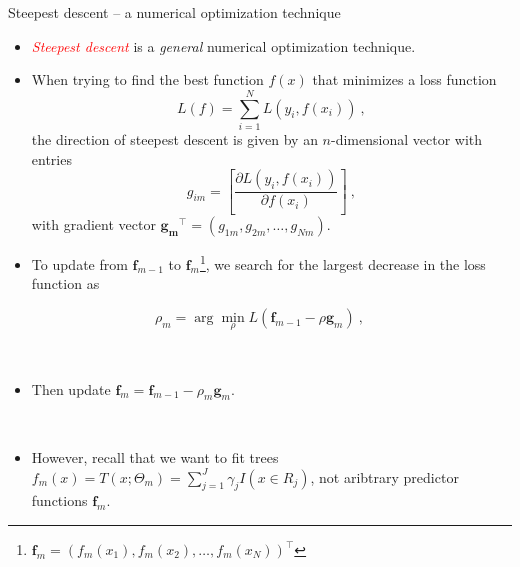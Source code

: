 \documentclass[
  10pt,
  ignorenonframetext,
]{beamer}
\providecommand{\tightlist}{%
  \setlength{\itemsep}{0pt}\setlength{\parskip}{0pt}}
\begin{document}
\begin{frame}
\begin{block}{Steepest descent -- a numerical optimization technique}
\protect\hypertarget{steepest-descent-a-numerical-optimization-technique}{}
\(~\)

\begin{itemize}
\tightlist
\item
  \emph{\textcolor{red}{Steepest descent}} is a \emph{general} numerical
  optimization technique.
\end{itemize}

\vspace{2mm}

\begin{itemize}
\tightlist
\item
  When trying to find the best function \(f(x)\) that minimizes a loss
  function \[L(f) = \sum_{i=1}^N L(y_i,f(x_i)) \ ,\] the direction of
  steepest descent is given by an \(n\)-dimensional vector with entries
  \[g_{im} = \left[ \frac{\partial L(y_i,f(x_i))}{\partial f(x_i)} \right] \ ,\]
  with gradient vector
  \(\mathbf{g_m}^\top = (g_{1m},g_{2m},\ldots, g_{Nm})\).
\end{itemize}
\end{block}
\end{frame}

\begin{frame}
\begin{itemize}
\tightlist
\item
  To update from \(\mathbf{f}_{m-1}\) to
  \(\mathbf{f}_m\)\footnote{$\mathbf{f}_m = (f_m(x_1),f_m(x_2),\ldots, f_m(x_N))^\top$ },
  we search for the largest decrease in the loss function as
\end{itemize}

\[\rho_m = \arg \min_\rho L(\mathbf{f}_{m-1} - \rho \mathbf{g}_m) \ , \]

\(~\)

\begin{itemize}
\tightlist
\item
  Then update \(\mathbf{f}_m = \mathbf{f}_{m-1} - \rho_m \mathbf{g}_m\).
\end{itemize}

\(~\)

\pause

\begin{itemize}
\tightlist
\item
  However, recall that we want to fit trees
  \(f_m(x)=T(x;\Theta_m)=\sum_{j=1}^J \gamma_j I(x\in R_j)\), not
  aribtrary predictor functions \(\mathbf{f}_m\).
\end{itemize}
\end{frame}
\end{document}
